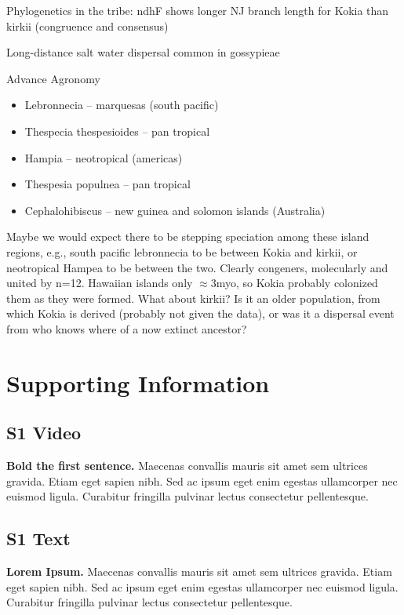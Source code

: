\documentclass[10pt,letterpaper]{article}
\begin{document}
{
  \color{Blue}
Phylogenetics in the tribe: ndhF shows longer NJ branch length for Kokia than kirkii (congruence and consensus)

Long-distance salt water dispersal common in gossypieae


Advance Agronomy
\begin{itemize}
\item Lebronnecia – marquesas (south pacific)
\item Thespecia thespesioides – pan tropical
\item Hampia – neotropical (americas)
\item Thespesia populnea – pan tropical
\item Cephalohibiscus – new guinea and solomon islands (Australia)
\end{itemize}

Maybe we would expect there to be stepping speciation among these island
regions, e.g., south pacific lebronnecia to be between Kokia and kirkii, or
neotropical Hampea to be between the two. Clearly congeners, molecularly and
united by n=12. Hawaiian islands only $\approx$3myo, so Kokia probably colonized them as
they were formed. What about kirkii? Is it an older population, from which Kokia
is derived (probably not given the data), or was it a dispersal event from who
knows where of a now extinct ancestor?

}

  
\section*{Supporting Information}

\subsection*{S1 Video}
\label{S1_Video}
{\bf Bold the first sentence.}  Maecenas convallis mauris sit amet sem ultrices gravida. Etiam eget sapien nibh. Sed ac ipsum eget enim egestas ullamcorper nec euismod ligula. Curabitur fringilla pulvinar lectus consectetur pellentesque.

\subsection*{S1 Text}
\label{S1_Text}
{\bf Lorem Ipsum.} Maecenas convallis mauris sit amet sem ultrices gravida. Etiam eget sapien nibh. Sed ac ipsum eget enim egestas ullamcorper nec euismod ligula. Curabitur fringilla pulvinar lectus consectetur pellentesque.
\end{document}
